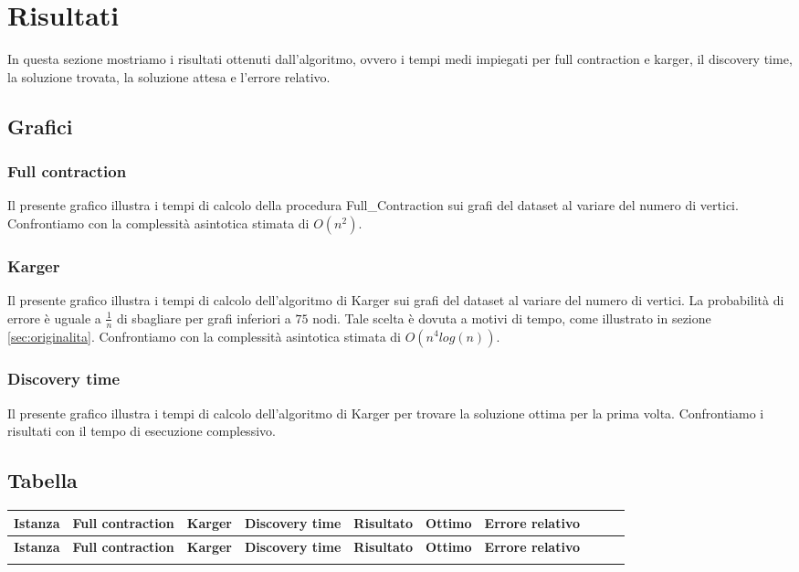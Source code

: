 \chapter{Risultati\label{sec:risultati}}
\noindent In questa sezione mostriamo i risultati ottenuti dall'algoritmo, ovvero i tempi medi impiegati per full contraction e karger, il discovery time, la soluzione trovata, la soluzione attesa e l'errore relativo.

\section{Grafici\label{sec:grafici}}

\subsection{Full contraction\label{sec:fc}}

Il presente grafico illustra i tempi di calcolo della procedura Full\_Contraction sui grafi del dataset al variare del numero di vertici. Confrontiamo con la complessità asintotica stimata di \(O(n^{2})\).

\subsection{Karger\label{sec:karger}}

Il presente grafico illustra i tempi di calcolo dell'algoritmo di Karger sui grafi del dataset al variare del numero di vertici. La probabilità di errore è uguale a \(\frac{1}{n}\) di sbagliare per grafi inferiori a $75$ nodi. Tale scelta è dovuta a motivi di tempo, come illustrato in sezione \vref{sec:originalita}. Confrontiamo con la complessità asintotica stimata di \(O(n^{4}log(n))\).

\subsection{Discovery time\label{sec:dt}}

Il presente grafico illustra i tempi di calcolo dell'algoritmo di Karger per trovare la soluzione ottima per la prima volta. Confrontiamo i risultati con il tempo di esecuzione complessivo.


\section{Tabella\label{sec:tabella}}

\footnotesize
\begin{tabularx}{\textwidth}{*{10}{Y}}
    \toprule
    \textbf{Istanza} & \textbf{Full contraction} & \textbf{Karger} & \textbf{Discovery time} & \textbf{Risultato} & \textbf{Ottimo} & \textbf{Errore relativo}\\
    \endfirsthead
    \toprule
    \textbf{Istanza} & \textbf{Full contraction} & \textbf{Karger} & \textbf{Discovery time} & \textbf{Risultato} & \textbf{Ottimo} & \textbf{Errore relativo}\\
    \endhead
    \midrule
    
    \bottomrule
    \caption{Risultati}\label{tab:risultati}
\end{tabularx}

